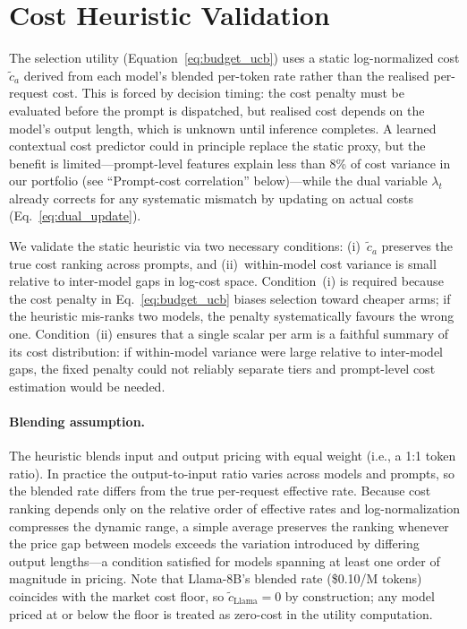 
\vspace*{-10pt}
\section{Cost Heuristic Validation}
\label{sec:cost_heuristic_validation}

The selection utility (Equation~\ref{eq:budget_ucb}) uses a static
log-normalized cost $\tilde{c}_a$ derived from each model's blended
per-token rate rather than the realised per-request cost.
This is forced by decision timing: the cost penalty must be evaluated
before the prompt is dispatched, but realised cost depends on the
model's output length, which is unknown until inference completes.
A learned contextual cost predictor could in principle replace the
static proxy, but the benefit is limited---prompt-level features
explain less than 8\% of cost variance in our portfolio (see
``Prompt-cost correlation'' below)---while the dual variable
$\lambda_t$ already corrects for any systematic mismatch by updating
on actual costs (Eq.~\ref{eq:dual_update}).

We validate the static heuristic via two necessary conditions:
(i)~$\tilde{c}_a$ preserves the true cost ranking across prompts,
and (ii)~within-model cost variance is small relative to inter-model
gaps in log-cost space.
Condition~(i) is required because the cost penalty in
Eq.~\ref{eq:budget_ucb} biases selection toward cheaper arms; if the
heuristic mis-ranks two models, the penalty systematically favours
the wrong one.
Condition~(ii) ensures that a single scalar per arm is a faithful
summary of its cost distribution: if within-model variance were large
relative to inter-model gaps, the fixed penalty could not reliably
separate tiers and prompt-level cost estimation would be needed.

\paragraph{Blending assumption.}
The heuristic blends input and output pricing with equal weight
(i.e., a 1:1 token ratio).
In practice the output-to-input ratio varies across models and
prompts, so the blended rate differs from the true per-request
effective rate.
Because cost ranking depends only on the relative order of effective
rates and log-normalization compresses the dynamic range, a simple
average preserves the ranking whenever the price gap between models
exceeds the variation introduced by differing output lengths---a
condition satisfied for models spanning at least one order of
magnitude in pricing.
Note that Llama-8B's blended rate (\$0.10/M tokens) coincides with
the market cost floor, so $\tilde{c}_{\text{Llama}} = 0$ by
construction; any model priced at or below the floor is treated as
zero-cost in the utility computation.

